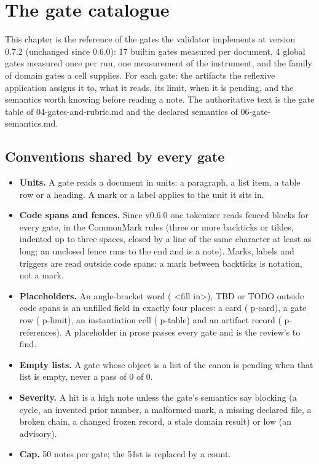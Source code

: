 \documentclass[
  american,
  10pt,
]{report}
\providecommand{\tightlist}{%
  \setlength{\itemsep}{0pt}\setlength{\parskip}{0pt}}
\renewcommand{\texttt}[1]{{\ttfamily\hyphenchar\font=-1 #1}}
\begin{document}
\chapter{The gate catalogue}\label{the-gate-catalogue}

This chapter is the reference of the gates the validator implements at
version 0.7.2 (unchanged since 0.6.0): 17 builtin gates measured per
document, 4 global gates measured once per run, one measurement of the
instrument, and the family of domain gates a cell supplies. For each
gate: the artifacts the reflexive application assigns it to, what it
reads, its limit, when it is pending, and the semantics worth knowing
before reading a note. The authoritative text is the gate table of
\texttt{04-\allowbreak{}gates-\allowbreak{}and-\allowbreak{}rubric.\allowbreak{}md}
and the declared semantics of
\texttt{06-\allowbreak{}gate-\allowbreak{}semantics.\allowbreak{}md}.

\section{Conventions shared by every
gate}\label{conventions-shared-by-every-gate}

\begin{itemize}
\tightlist
\item
  \textbf{Units.} A gate reads a document in units: a paragraph, a list
  item, a table row or a heading. A mark or a label applies to the unit
  it sits in.
\item
  \textbf{Code spans and fences.} Since v0.6.0 one tokenizer reads
  fenced blocks for every gate, in the CommonMark rules (three or more
  backticks or tildes, indented up to three spaces, closed by a line of
  the same character at least as long; an unclosed fence runs to the end
  and is a note). Marks, labels and triggers are read outside code
  spans: a mark between backticks is notation, not a mark.
\item
  \textbf{Placeholders.} An angle-bracket word (\texttt{<fill in>}),
  \texttt{TBD} or \texttt{TODO} outside code spans is an unfilled field
  in exactly four places: a card (\texttt{p-\allowbreak{}card}), a gate
  row (\texttt{p-\allowbreak{}limit}), an instantiation cell
  (\texttt{p-\allowbreak{}table}) and an artifact record
  (\texttt{p-\allowbreak{}references}). A placeholder in prose passes
  every gate and is the review's to find.
\item
  \textbf{Empty lists.} A gate whose object is a list of the canon is
  pending when that list is empty, never a pass of 0 of 0.
\item
  \textbf{Severity.} A hit is a high note unless the gate's semantics
  say blocking (a cycle, an invented prior number, a malformed mark, a
  missing declared file, a broken chain, a changed frozen record, a
  stale domain result) or low (an advisory).
\item
  \textbf{Cap.} 50 notes per gate; the 51st is replaced by a count.
\end{itemize}
\end{document}

